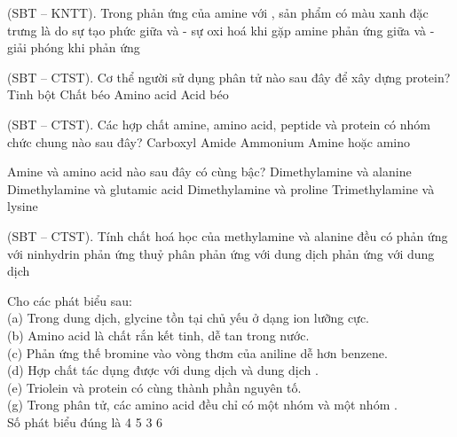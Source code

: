 \documentclass[11pt,a4paper]{article}
\def\loigiai#1{}
\begin{document}
\begin{ex}
(SBT -- KNTT). Trong phản ứng của amine với , sản phẩm có màu xanh đặc trưng là do
\choice
{sự tạo phức giữa  và -}
{sự oxi hoá  khi gặp amine}
{phản ứng giữa  và -}
{giải phóng  khi phản ứng}
\loigiai{}
\end{ex}

\begin{ex}
(SBT -- CTST). Cơ thể người sử dụng phân tử nào sau đây để xây dựng protein?
\choice
{Tinh bột}
{Chất béo}
{Amino acid}
{Acid béo}
\loigiai{}
\end{ex}

\begin{ex}
(SBT -- CTST). Các hợp chất amine, amino acid, peptide và protein có nhóm chức chung nào sau đây?
\choice
{Carboxyl}
{Amide}
{Ammonium}
{Amine hoặc amino}
\loigiai{}
\end{ex}

\begin{ex}
Amine và amino acid nào sau đây có cùng bậc?
\choice
{Dimethylamine và alanine}
{Dimethylamine và glutamic acid}
{Dimethylamine và proline}
{Trimethylamine và lysine}
\loigiai{}
\end{ex}

\begin{ex}
(SBT -- CTST). Tính chất hoá học của methylamine và alanine đều có
\choice
{phản ứng với ninhydrin}
{phản ứng thuỷ phân}
{phản ứng với dung dịch }
{phản ứng với dung dịch }
\loigiai{}
\end{ex}

\begin{ex}
Cho các phát biểu sau:\\
(a) Trong dung dịch, glycine tồn tại chủ yếu ở dạng ion lưỡng cực.\\
(b) Amino acid là chất rắn kết tinh, dễ tan trong nước.\\
(c) Phản ứng thế bromine vào vòng thơm của aniline dễ hơn benzene.\\
(d) Hợp chất  tác dụng được với dung dịch  và dung dịch .\\
(e) Triolein và protein có cùng thành phần nguyên tố.\\
(g) Trong phân tử, các amino acid đều chỉ có một nhóm  và một nhóm .\\
Số phát biểu đúng là
\choice
{4}
{5}
{3}
{6}
\loigiai{}
\end{ex}

\end{document}
